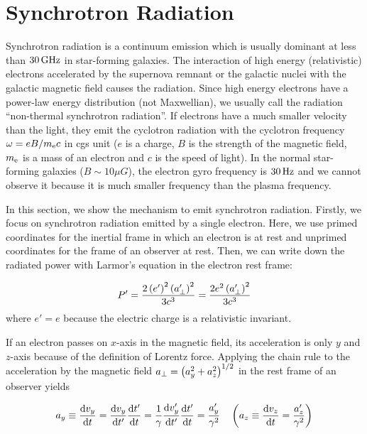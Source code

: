 \section{Synchrotron Radiation}\label{sec:synchrotronradiation}

Synchrotron radiation is a continuum emission which is usually dominant at less than $30\,\mathrm{GHz}$ in star-forming galaxies.
The interaction of high energy (relativistic) electrons accelerated by the supernova remnant or the galactic nuclei with the galactic magnetic field causes the radiation.
Since high energy electrons have a power-law energy distribution (not Maxwellian), we usually call the radiation ``non-thermal synchrotron radiation''.
If electrons have a much smaller velocity than the light, they emit the cyclotron radiation with the cyclotron frequency $\omega = eB / m_{\mathrm{e}}c$ in cgs unit ($e$ is a charge, $B$ is the strength of the magnetic field, $m_{\mathrm{e}}$ is a mass of an electron and $c$ is the speed of light).
In the normal star-forming galaxies ($B\sim10\mu G$), the electron gyro frequency is $30\,\mathrm{Hz}$ and we cannot observe it because it is much smaller frequency than the plasma frequency.

In this section, we show the mechanism to emit synchrotron radiation.
Firstly, we focus on synchrotron radiation emitted by a single electron.
Here, we use primed coordinates for the inertial frame in which an electron is at rest and unprimed coordinates for the frame of an observer at rest.
Then, we can write down the radiated power with Larmor's equation in the electron rest frame:

\begin{equation}\label{eq:essential_radio5n24}
    P^{\prime}=\frac{2\left(e^{\prime}\right)^{2}\left(a_{\perp}^{\prime}\right)^{2}}{3 c^{3}}=\frac{2 e^{2}\left(a_{\perp}^{\prime}\right)^{2}}{3 c^{3}}
\end{equation}
where $e'=e$ because the electric charge is a relativistic invariant.

If an electron passes on $x$-axis in the magnetic field, its acceleration is only $y$ and $z$-axis because of the definition of Lorentz force.
Applying the chain rule to the acceleration by the magnetic field $a_{\perp} = \left(a^2_y + a^2_z\right)^{1/2}$ in the rest frame of an observer yields

\begin{equation}\label{eq:essential_radio5n25}
    a_y \equiv \frac{\mathrm{d} v_y}{\mathrm{d} t}=\frac{\mathrm{d} v_y}{\mathrm{d} t^{\prime}} \frac{\mathrm{d} t^{\prime}}{\mathrm{d} t}=\frac{1}{\gamma} \frac{\mathrm{d} v_y^{\prime}}{\mathrm{d} t^{\prime}} \frac{\mathrm{d} t^{\prime}}{\mathrm{d} t}=\frac{a_y^{\prime}}{\gamma^2}\ \ \ \left(a_z \equiv \frac{\mathrm{d} v_z}{\mathrm{d} t} = \frac{a'_z}{\gamma^2}\right)
\end{equation}

